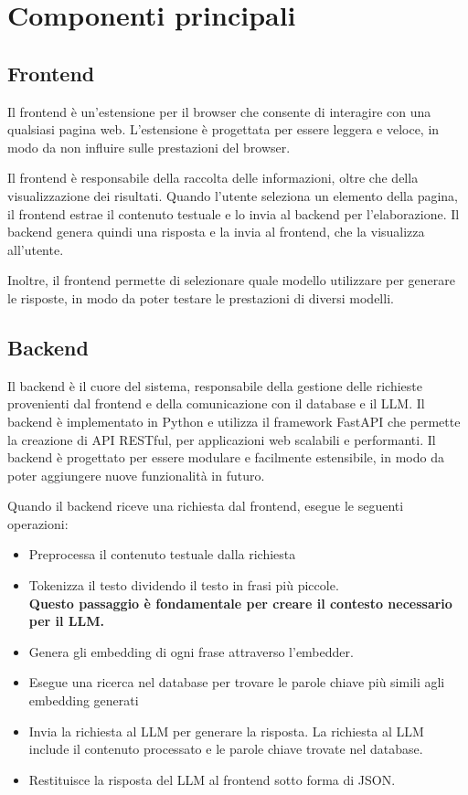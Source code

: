 \section{Componenti principali}
\label{sec:componenti}
\subsection{Frontend}
\label{sec:frontend}
Il frontend è un'estensione per il browser che consente di
interagire con una qualsiasi pagina web.
L'estensione è progettata per essere leggera e veloce, in
modo da non influire sulle prestazioni del browser.

Il frontend è responsabile della raccolta delle
informazioni, oltre che della visualizzazione dei
risultati.
Quando l'utente seleziona un elemento della pagina, il
frontend estrae il contenuto testuale e lo invia al backend
per l'elaborazione.
Il backend genera quindi una risposta e la invia al
frontend, che la visualizza all'utente.

Inoltre, il frontend permette di selezionare quale modello
utilizzare per generare le risposte, in modo da poter
testare le prestazioni di diversi modelli.

\subsection{Backend}
\label{sec:backend}

Il backend è il cuore del sistema, responsabile della
gestione delle richieste provenienti dal frontend e della
comunicazione con il database e il LLM.
Il backend è implementato in Python e utilizza il framework
FastAPI che permette la creazione di API RESTful, per
applicazioni web scalabili e performanti.
Il backend è progettato per essere modulare e facilmente
estensibile, in modo da poter aggiungere nuove funzionalità
in futuro.

Quando il backend riceve una richiesta dal frontend, esegue
le seguenti operazioni:
\begin{itemize}
      \item Preprocessa il contenuto testuale dalla richiesta
      \item Tokenizza il testo dividendo il testo in frasi
            più piccole.\\
            \textbf{Questo passaggio è fondamentale per creare il contesto
                  necessario per il LLM.}
      \item Genera gli embedding di ogni frase attraverso
            l'embedder.
      \item Esegue una ricerca nel database per trovare le
            parole chiave più simili agli embedding generati
      \item Invia la richiesta al LLM per generare la risposta.
            La richiesta al LLM include il contenuto processato e le
            parole chiave trovate nel database.
      \item Restituisce la risposta del LLM al frontend sotto forma di
            JSON.
\end{itemize}

